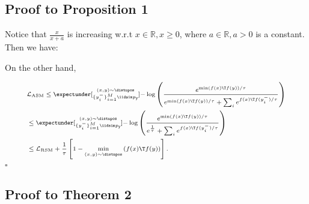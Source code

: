 
\subsection{ Proof to Proposition 1} \label{sec:proof1}

\begin{pf}
Notice that $\frac{x}{x+a}$ is increasing w.r.t $x\in \mathbb{R}, x \geq 0$, where $a\in \mathbb{R}, a > 0$ is a constant. Then we have:

On the other hand,

\begin{equation}{\scriptsize
\begin{aligned}
&\mathcal{L}_{\rm ASM} \leq \expectunder[\substack{(x, y) \sim \distnpos \\
\{y^-_i\}_{i=1}^M \iidsim p_{\mathsf y}}]{-\log \left(\frac{e^{{\min}\left(f(x)\T f(y)\right)/\tau}}{e^{{\min}\left(f(x)\T f(y)\right)/\tau} + \sum_ie^{f(x)\T f(y^-_i)/\tau}}\right)}\\
& \leq  \expectunder[\substack{(x, y) \sim \distnpos \\
\{y^-_i\}_{i=1}^M \iidsim p_{\mathsf y}}]{-\log \left(\frac{e^{{\min}\left(f(x)\T f(y)\right)/\tau}}{e^{\frac{1}{\tau}} + \sum_ie^{f(x)\T f(y^-_i) / \tau}}\right)}\\
& \leq\mathcal{L}_{\rm RSM} + \frac{1}{\tau}\left[1-\underset{(x, y) \sim \distnpos}{\min}\left(f(x)\T f(y)\right)\right]. 
\end{aligned}
}\end{equation}
\hfill $\square$
\end{pf}

\subsection{ Proof to Theorem 2} \label{sec:proof2}

